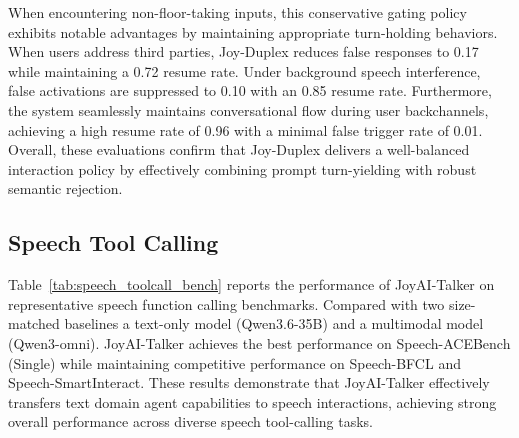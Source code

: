 When encountering non-floor-taking inputs, this conservative gating policy exhibits notable advantages by maintaining appropriate turn-holding behaviors. When users address third parties, Joy-Duplex reduces false responses to 0.17 while maintaining a 0.72 resume rate. Under background speech interference, false activations are suppressed to 0.10 with an 0.85 resume rate. Furthermore, the system seamlessly maintains conversational flow during user backchannels, achieving a high resume rate of 0.96 with a minimal false trigger rate of 0.01. Overall, these evaluations confirm that Joy-Duplex delivers a well-balanced interaction policy by effectively combining prompt turn-yielding with robust semantic rejection.



\subsection{Speech Tool Calling}

Table~\ref{tab:speech_toolcall_bench} reports the performance of JoyAI-Talker on representative speech function calling benchmarks. Compared with two size-matched baselines a text-only model (Qwen3.6-35B) and a multimodal model (Qwen3-omni). JoyAI-Talker achieves the best performance on Speech-ACEBench (Single) while maintaining competitive performance on Speech-BFCL and Speech-SmartInteract. These results demonstrate that JoyAI-Talker effectively transfers text domain agent capabilities to speech interactions, achieving strong overall performance across diverse speech tool-calling tasks.

